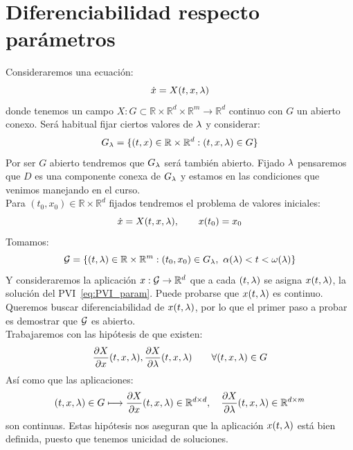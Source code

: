 \documentclass[12pt]{book}
\begin{document}
\section{Diferenciabilidad respecto parámetros} %
\begin{teo}
    Consideraremos una ecuación:
    \begin{equation*}
        \dot{x} = X(t,x,\lambda)
    \end{equation*}
    donde tenemos un campo $X:G\subset \mathbb{R}\times\mathbb{R}^d\times\mathbb{R}^m\to \mathbb{R}^d$ continuo con $G$ un abierto conexo. Será habitual fijar ciertos valores de $\lambda$  y considerar:
    \begin{equation*}
        G_\lambda = \{(t,x)\in \mathbb{R}\times\mathbb{R}^d : (t,x,\lambda)\in G\}
    \end{equation*}
    Por ser $G$ abierto tendremos que $G_\lambda$ será también abierto. Fijado $\lambda$ pensaremos que $D$ es una componente conexa de $G_\lambda$ y estamos en las condiciones que venimos manejando en el curso.\\

    \noindent
    Para $(t_0,x_0)\in \mathbb{R}\times\mathbb{R}^d$ fijados tendremos el problema de valores iniciales:
    \begin{equation}\label{eq:PVI_param}
        \dot{x} = X(t,x,\lambda), \qquad x(t_0) = x_0
    \end{equation}
    Tomamos:
    \begin{equation*}
        \cc{G} = \{(t,\lm)\in \mathbb{R}\times\mathbb{R}^m : (t_0,x_0)\in G_\lm,\ \alpha(\lm)<t<\omega(\lm)\}
    \end{equation*}
    Y consideraremos la aplicación $x:\mathcal{G}\to \mathbb{R}^d$ que a cada $(t,\lambda)$ se asigna $x(t,\lambda)$, la solución del PVI~\eqref{eq:PVI_param}. Puede probarse que $x(t,\lambda)$ es continuo. Queremos buscar diferenciabilidad de $x(t,\lambda)$, por lo que el primer paso a probar es demostrar que $\mathcal{G}$ es abierto.\\


\noindent
Trabajaremos con las hipótesis de que existen:
\begin{equation*}
    \frac{\partial X}{\partial x}(t,x,\lambda), \frac{\partial X}{\partial \lambda}(t,x,\lambda)\qquad \forall (t,x,\lambda)\in G
\end{equation*}
Así como que las aplicaciones:
\begin{equation*}
    (t,x,\lambda)\in G \longmapsto \frac{\partial X}{\partial x}(t,x,\lambda)\in \mathbb{R}^{d\times d},\quad  \frac{\partial X}{\partial \lambda}(t,x,\lambda)\in \mathbb{R}^{d\times m}
\end{equation*}
son continuas. Estas hipótesis nos aseguran que la aplicación $x(t,\lambda)$ está bien definida, puesto que tenemos unicidad de soluciones.\\


\end{teo}
\end{document}
